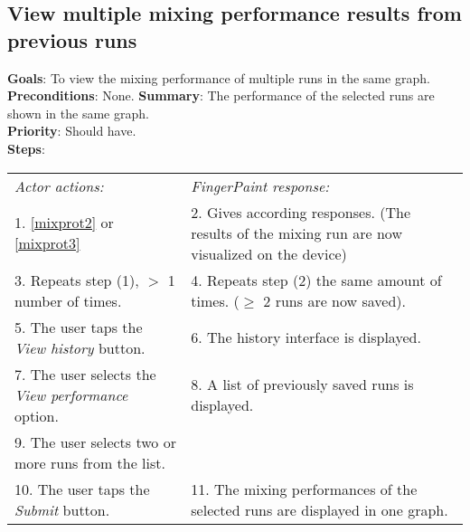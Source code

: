 \begin{appendices}
    \section{View multiple mixing performance results from previous runs}
  \label{viewmulruns}
  \textbf{Goals}: To view the mixing performance of multiple runs in the same graph.\\
  \textbf{Preconditions}: None. %
  \textbf{Summary}: The performance of the selected runs are shown in the same graph.\\
  \textbf{Priority}: Should have.\\
  \textbf{Steps}: \\
  \begin{tabular}{ p{} p{} }
  	\emph{Actor actions:} & \emph{FingerPaint response:} \\
    1. \ref{mixprot2} or \ref{mixprot3} & 2. Gives according responses. (The results of the mixing run are now visualized  on the device) \\
    3. Repeats step (1), $>$ 1 number of times. & 4. Repeats step (2) the same amount of times. ($\geq$ 2 runs are now saved).\\
	5. The user taps the \emph{View history} button. & 6. The history interface is displayed. \\
	 7. The user selects the \emph{View performance} option. & 8. A list of previously saved runs is displayed.\\
	 9. The user selects two or more runs from the list. & \\
	 10. The user taps the \emph{Submit} button. & 11. The mixing performances of the selected runs are displayed in one graph.\\
  \end{tabular}


\end{appendices}
